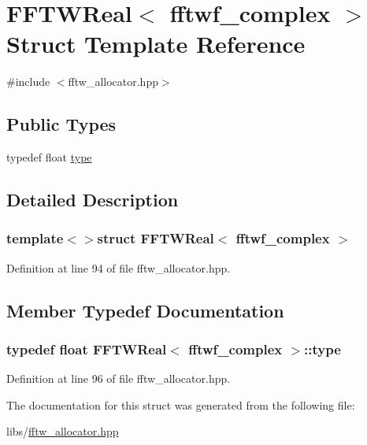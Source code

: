\hypertarget{struct_f_f_t_w_real_3_01fftwf__complex_01_4}{\section{F\-F\-T\-W\-Real$<$ fftwf\-\_\-complex $>$ Struct Template Reference}
\label{struct_f_f_t_w_real_3_01fftwf__complex_01_4}
}


{\ttfamily \#include $<$fftw\-\_\-allocator.\-hpp$>$}

\subsection*{Public Types}
\begin{DoxyCompactItemize}
\item 
typedef float \hyperlink{struct_f_f_t_w_real_3_01fftwf__complex_01_4_ad25d1e11a983175756534f7173802db8}{type}
\end{DoxyCompactItemize}


\subsection{Detailed Description}
\subsubsection*{template$<$$>$struct F\-F\-T\-W\-Real$<$ fftwf\-\_\-complex $>$}



Definition at line 94 of file fftw\-\_\-allocator.\-hpp.



\subsection{Member Typedef Documentation}
\hypertarget{struct_f_f_t_w_real_3_01fftwf__complex_01_4_ad25d1e11a983175756534f7173802db8}{
\subsubsection[{type}]{\setlength{\rightskip}{0pt plus 5cm}typedef float {\bf F\-F\-T\-W\-Real}$<$ fftwf\-\_\-complex $>$\-::{\bf type}}}\label{struct_f_f_t_w_real_3_01fftwf__complex_01_4_ad25d1e11a983175756534f7173802db8}


Definition at line 96 of file fftw\-\_\-allocator.\-hpp.



The documentation for this struct was generated from the following file\-:\begin{DoxyCompactItemize}
\item 
libs/\hyperlink{fftw__allocator_8hpp}{fftw\-\_\-allocator.\-hpp}\end{DoxyCompactItemize}
